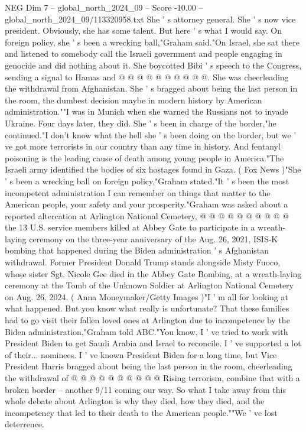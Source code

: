 \begin{textsample}{NEG Dim 7 – global\_north\_2024\_09 – Score -10.00 – global\_north\_2024\_09/113320958.txt}
She ' s attorney general.
She ' s now vice president.
Obviously, she has some talent.
But here ' s what I would say.
On foreign policy, she ' s been a wrecking ball,"Graham said."On Israel, she sat there and listened to somebody call the Israeli government and people engaging in genocide and did nothing about it.
She boycotted Bibi ' s speech to the Congress, sending a signal to Hamas and @ @ @ @ @ @ @ @ @ @.
She was cheerleading the withdrawal from Afghanistan.
She ' s bragged about being the last person in the room, the dumbest decision maybe in modern history by American administration.""I was in Munich when she warned the Russians not to invade Ukraine.
Four days later, they did.
She ' s been in charge of the border,"he continued."I don't know what the hell she ' s been doing on the border, but we ' ve got more terrorists in our country than any time in history.
And fentanyl poisoning is the leading cause of death among young people in America."The Israeli army identified the bodies of six hostages found in Gaza. ( Fox News )"She ' s been a wrecking ball on foreign policy,"Graham stated."It ' s been the most incompetent administration I can remember on things that matter to the American people, your safety and your prosperity."Graham was asked about a reported altercation at Arlington National Cemetery, @ @ @ @ @ @ @ @ @ @ the 13 U.S. service members killed at Abbey Gate to participate in a wreath-laying ceremony on the three-year anniversary of the Aug. 26, 2021, ISIS-K bombing that happened during the Biden administration ' s Afghanistan withdrawal.
Former President Donald Trump stands alongside Misty Fuoco, whose sister Sgt.
Nicole Gee died in the Abbey Gate Bombing, at a wreath-laying ceremony at the Tomb of the Unknown Soldier at Arlington National Cemetery on Aug. 26, 2024. ( Anna Moneymaker/Getty Images )"I ' m all for looking at what happened.
But you know what really is unfortunate?
That these families had to go visit their fallen loved ones at Arlington due to incompetence by the Biden administration,"Graham told ABC."You know, I ' ve tried to work with President Biden to get Saudi Arabia and Israel to reconcile.
I ' ve supported a lot of their... nominees.
I ' ve known President Biden for a long time, but Vice President Harris bragged about being the last person in the room, cheerleading the withdrawal of @ @ @ @ @ @ @ @ @ @ Rising terrorism, combine that with a broken border -- another 9/11 coming our way.
So what I take away from this whole debate about Arlington is why they died, how they died, and the incompetency that led to their death to the American people.""We ' ve lost deterrence.

\end{textsample}
